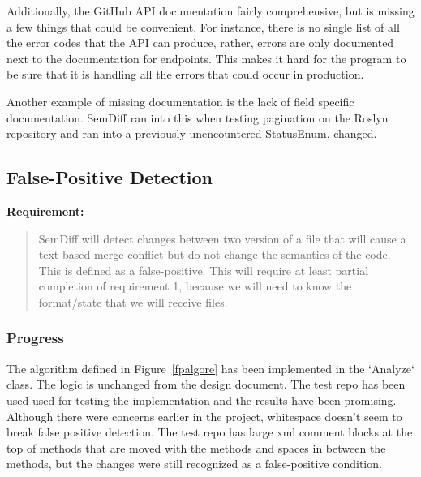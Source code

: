 \documentclass[draftclsnofoot,onecolumn]{IEEEtran}
\begin{document}
Additionally, the GitHub API documentation fairly comprehensive, but is 
missing a few things that could be convenient. For instance, there is no 
single list of all the error codes that the API can produce, rather, errors 
are only documented next to the documentation for endpoints. This makes it 
hard for the program to be sure that it is handling all the errors that 
could occur in production.

Another example of missing documentation is the lack of field specific 
documentation. SemDiff ran into this when testing pagination on the Roslyn 
repository and ran into a previously unencountered StatusEnum, changed. 






\subsection{False-Positive Detection}

\textbf{Requirement:}

\begin{quote}

SemDiff will detect changes between two version of a file that will cause a 
text-based merge conflict but do not change the semantics of the code. This 
is defined as a false-positive. This will require at least partial 
completion of requirement 1, because we will need to know the format/state 
that we will receive files.

\end{quote}

\subsubsection{Progress}
The algorithm defined in Figure~\ref{fpalgore} has been implemented in the 
`Analyze` class. The logic is unchanged from the design document. The test 
repo has been used used for testing the implementation and the results have 
been promising. Although there were concerns earlier in the project, 
whitespace doesn’t seem to break false positive detection. The test repo has 
large xml comment blocks at the top of methods that are moved with the 
methods and spaces in between the methods, but the changes were still 
recognized as a false-positive condition.
\end{document}
